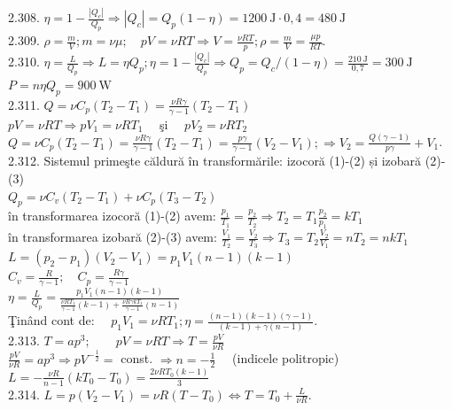 2.308. $\eta=1-\frac{\left|Q_{c}\right|}{Q_{p}} \Rightarrow\left|Q_{c}\right|=Q_{p}(1-\eta)=1200 \mathrm{~J} \cdot 0,4=480 \mathrm{~J}$\\

2.309. $\rho=\frac{m}{V} ; m=\nu \mu ; \quad p V=\nu R T \Rightarrow V=\frac{\nu R T}{p} ; \rho=\frac{m}{V}=\frac{\mu p}{R T}$.\\

2.310. $\eta=\frac{L}{Q_{p}} \Rightarrow L=\eta Q_{p} ; \eta=1-\frac{\left|Q_{c}\right|}{Q_{p}} \Rightarrow Q_{p}=Q_{c} /(1-\eta)=\frac{210 \mathrm{~J}}{0,7}=300 \mathrm{~J}$\\ $P=n \eta Q_{p}=900 \mathrm{~W}$\\

2.311. $Q=\nu C_{p}\left(T_{2}-T_{1}\right)=\frac{\nu R \gamma}{\gamma-1}\left(T_{2}-T_{1}\right)$\\ $p V=\nu R T \Rightarrow p V_{1}=\nu R T_{1} \quad$ şi $\quad p V_{2}=\nu R T_{2}$\\ $Q=\nu C_{p}\left(T_{2}-T_{1}\right)=\frac{\nu R \gamma}{\gamma-1}\left(T_{2}-T_{1}\right)=\frac{p \gamma}{\gamma-1}\left(V_{2}-V_{1}\right) ; \Rightarrow V_{2}=\frac{Q(\gamma-1)}{p \gamma}+V_{1}$.\\

2.312. Sistemul primeşte căldură în transformările: izocoră (1)-(2) și izobară (2)-(3)\\ $Q_{p}=\nu C_{v}\left(T_{2}-T_{1}\right)+\nu C_{p}\left(T_{3}-T_{2}\right)$\\ în transformarea izocoră (1)-(2) avem: $\frac{p_{1}}{T_{1}}=\frac{p_{2}}{T_{2}} \Rightarrow T_{2}=T_{1} \frac{p_{2}}{p_{1}}=k T_{1}$\\ în transformarea izobară (2)-(3) avem: $\frac{V_{1}}{T_{2}}=\frac{V_{2}}{T_{3}} \Rightarrow T_{3}=T_{2} \frac{V_{2}}{V_{1}}=n T_{2}=n k T_{1}$\\ $L=\left(p_{2}-p_{1}\right)\left(V_{2}-V_{1}\right)=p_{1} V_{1}(n-1)(k-1)$\\ $C_{v}=\frac{R}{\gamma-1} ; \quad C_{p}=\frac{R \gamma}{\gamma-1}$\\ $\eta=\frac{L}{Q_{p}}=\frac{p_{1} V_{1}(n-1)(k-1)}{\frac{\nu R T_{1}}{\gamma-1}(k-1)+\frac{\nu R \gamma k T_{1}}{\gamma-1}(n-1)}$\\ Ţinând cont de: $\quad p_{1} V_{1}=\nu R T_{1} ; \eta=\frac{(n-1)(k-1)(\gamma-1)}{(k-1)+\gamma(n-1)}$.\\

2.313. $T=a p^{3} ; \quad \quad p V=\nu R T \Rightarrow T=\frac{p V}{\nu R}$ \\ $\frac{p V}{\nu R}=a p^{3} \Rightarrow p V^{-\frac{1}{2}}=$ const. $\Rightarrow n=-\frac{1}{2} \quad$ (indicele politropic) \\ $L=-\frac{\nu R}{n-1}\left(k T_{0}-T_{0}\right)=\frac{2 \nu R T_{0}(k-1)}{3}$\\

2.314. $L=p\left(V_{2}-V_{1}\right)=\nu R\left(T-T_{0}\right) \Leftrightarrow T=T_{0}+\frac{L}{\nu R}$.\\

